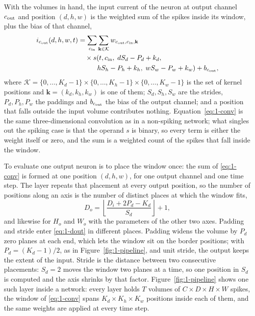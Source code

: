 With the volumes in hand, the input current of the neuron at output channel
$c_{\mathrm{out}}$ and position $(d,h,w)$ is the weighted sum of the spikes inside its
window, plus the bias of that channel,
\begin{equation}
\begin{split}
i_{c_{\mathrm{out}}}(d,h,w,t) &= \sum_{c_{\mathrm{in}}}\sum_{\mathbf{k}\in\mathcal{K}}
w_{c_{\mathrm{out}},c_{\mathrm{in}},\mathbf{k}}\\
&\quad\times s(t,c_{\mathrm{in}},\; dS_d-P_d+k_d,\\
&\hspace{2.8em} hS_h-P_h+k_h,\; wS_w-P_w+k_w) + b_{c_{\mathrm{out}}},
\end{split}
\label{eq:1-conv}
\end{equation}
where $\mathcal{K}=\{0,\dots,K_d-1\}\times\{0,\dots,K_h-1\}\times\{0,\dots,K_w-1\}$
is the set of kernel positions and $\mathbf{k}=(k_d,k_h,k_w)$ is one of them;
$S_d,S_h,S_w$ are the strides, $P_d,P_h,P_w$ the paddings and $b_{c_{\mathrm{out}}}$ the
bias of the output channel; and a position that falls outside the input volume
contributes nothing.
Equation~\eqref{eq:1-conv} is the same three-dimensional convolution as in a
non-spiking network; what singles out the spiking case is that the operand $s$
is binary, so every term is either the weight itself or zero, and the sum is a
weighted count of the spikes that fall inside the window.

To evaluate one output neuron is to place the window once: the sum of
\eqref{eq:1-conv} is formed at one position $(d,h,w)$, for one output channel
and one time step. The layer repeats that placement at every output position,
so the number of positions along an axis is the number of distinct places at
which the window fits,
\begin{equation}
D_o = \left\lfloor \frac{D_i + 2P_d - K_d}{S_d} \right\rfloor + 1 ,
\label{eq:1-dout}
\end{equation}
and likewise for $H_o$ and $W_o$ with the parameters of the other two axes.
Padding and stride enter \eqref{eq:1-dout} in different places. Padding widens
the volume by $P_d$ zero planes at each end, which lets the window sit on the
border positions; with $P_d=(K_d-1)/2$, as in Figure~\ref{fig:1-pipeline}, and
unit stride, the output keeps the extent of the input. Stride is the distance
between two consecutive placements: $S_d=2$ moves the window two planes at a
time, so one position in $S_d$ is computed and the axis shrinks by that factor.
Figure~\ref{fig:1-pipeline} shows one such layer inside a network: every layer
holds $T$ volumes of $C\times D\times H\times W$ spikes, the window of
\eqref{eq:1-conv} spans $K_d\times K_h\times K_w$ positions inside each of them,
and the same weights are applied at every time step.


